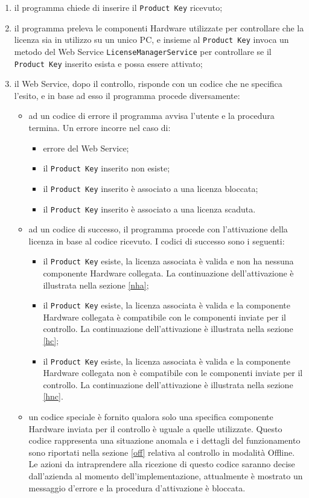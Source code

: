 \begin{enumerate}
\item il programma chiede di inserire il \texttt{Product Key} ricevuto;
\item il programma preleva le componenti Hardware utilizzate per controllare che la licenza sia in utilizzo su un unico PC, e insieme al \texttt{Product Key} invoca un metodo del Web Service \texttt{LicenseManagerService} per controllare se il \texttt{Product Key} inserito esista e possa essere attivato;
\item il Web Service, dopo il controllo, risponde con un codice che ne specifica l'esito, e in base ad esso il programma procede diversamente:
\begin{itemize}
\item ad un codice di errore il programma avvisa l'utente e la procedura termina. Un errore incorre nel caso di: \begin{itemize}
\item errore del Web Service;
\item il \texttt{Product Key} inserito non esiste;
\item il \texttt{Product Key} inserito è associato a una licenza bloccata;
\item il \texttt{Product Key} inserito è associato a una licenza scaduta.
\end{itemize}
\item ad un codice di successo, il programma procede con l'attivazione della licenza in base al codice ricevuto. I codici di successo sono i seguenti:
\begin{itemize}
\item il \texttt{Product Key} esiste, la licenza associata è valida e non ha nessuna componente Hardware collegata. La continuazione dell'attivazione è illustrata nella sezione \ref{nha};
\item il \texttt{Product Key} esiste, la licenza associata è valida e la componente Hardware collegata è compatibile con le componenti inviate per il controllo. La continuazione dell'attivazione è illustrata nella sezione \ref{hc};
\item il \texttt{Product Key} esiste, la licenza associata è valida e la componente Hardware collegata non è compatibile con le componenti inviate per il controllo. La continuazione dell'attivazione è illustrata nella sezione \ref{hnc}.
\end{itemize}
\item un codice speciale è fornito qualora solo una specifica componente Hardware inviata per il controllo è uguale a quelle utilizzate. Questo codice rappresenta una situazione anomala e i dettagli del funzionamento sono riportati nella sezione \ref{off} relativa al controllo in modalità Offline. Le azioni da intraprendere alla ricezione di questo codice saranno decise dall'azienda al momento dell'implementazione, attualmente è mostrato un messaggio d'errore e la procedura d'attivazione è bloccata.
\end{itemize}
\end{enumerate}

